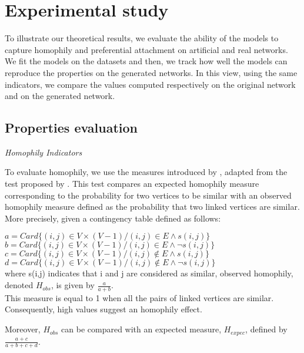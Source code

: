 \section{Experimental study}

To illustrate our theoretical results, we evaluate the ability of the models to capture homophily and preferential attachment on artificial and real networks.  We fit the models on the datasets and then, we track how well the models can reproduce the properties on the generated networks. In this view, using the same indicators, we compare the values computed respectively on the original network and on the generated network.

\subsection{Properties evaluation}

\textit{Homophily Indicators}

To evaluate homophily, we use the measures introduced by \cite{largeron2015}, adapted from the test proposed by \cite{Easley2010}.  This test compares an expected homophily measure corresponding to the probability for two vertices to be similar with an observed homophily measure defined as the probability that two linked vertices are similar. More precisely, given a contingency table defined as follows:

$a = Card\{(i,j)\in V\times (V-1) / (i,j) \in E \land s(i,j)\}$\\
$b = Card\{(i,j)\in V\times (V-1) / (i,j) \in E \land \neg{s(i,j)}\}$\\ 
$c = Card\{(i,j)\in V\times (V-1) / (i,j) \notin E \land s(i,j)\}$\\
$d = Card\{(i,j)\in V\times (V-1) / (i,j) \notin E \land \neg{s(i,j)}\}$\\

where  s(i,j) indicates that i and j are considered as similar, observed homophily, denoted $H_{obs}$, is given by $\frac{a}{a+b}$.\\
This measure  is equal to 1 when all the pairs of linked vertices are similar. Consequently, high values suggest an homophily effect.

Moreover, $H_{obs}$ can be compared with an expected measure, $H_{expec}$, defined by  $ \frac{a+c}{a+b+c+d}$.\\


